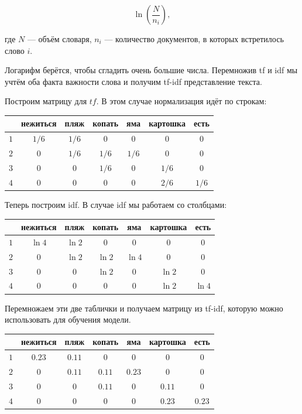 \documentclass[12pt, a4paper, oneside]{article}
\begin{document}
{\begin{enumerate}
\begin{itemize}
	\[ \ln \left( \frac{N}{n_i} \right), \]
	
	где $N$ --- объём словаря, $n_i$ --- количество документов, в которых встретилось слово $i$.
\end{itemize}

Логарифм берётся, чтобы сгладить очень большие числа. Перемножив tf и idf мы учтём оба факта важности слова и получим tf-idf представление текста. 

Построим матрицу для $tf$. В этом случае нормализация идёт по строкам:

\begin{center}
	\begin{tabular}{c|c|c|c|c|c|c}
		\hline
		&нежиться & пляж & копать & яма & картошка & есть \\
		\hline
		$1 $&  $1/6$ & $1/6$ & $0$ & $0 $& $0 $& $0$ \\
		$2$ & $0$ & $1/6$ & $1/6$ & $1/6$ & $0$ & $0$ \\
		$3$ & $0$ & $0$ & $1/6$ & $0$ & $1/6$ & $0$ \\
		$4$ &$ 0$ & $0$ &$ 0 $& $0$ & $2/6$ & $1/6$ \\
	\end{tabular}
\end{center}

Теперь построим idf. В случае idf мы работаем со столбцами: 

\begin{center}
	\begin{tabular}{c|c|c|c|c|c|c}
		\hline
		&нежиться & пляж & копать & яма & картошка & есть \\
		\hline
		$1 $&  $\ln 4$ & $\ln 2$ & $0$ & $0 $& $0 $& $0$ \\
		$2$ & $0$ & $\ln 2$ & $\ln 2$ & $\ln 4$ & $0$ & $0$ \\
		$3$ & $0$ & $0$ & $\ln 2$ & $0$ & $\ln 2$ & $0$ \\
		$4$ &$ 0$ & $0$ &$ 0 $& $0$ & $\ln 2$ & $\ln 4$ \\
	\end{tabular}
\end{center}

Перемножаем эти две таблички и получаем матрицу из tf-idf, которую можно использовать для обучения модели. 

\begin{center}
	\begin{tabular}{c|c|c|c|c|c|c}
		\hline
		&нежиться & пляж & копать & яма & картошка & есть \\
		\hline
		$1 $&  $0.23$ & $0.11$ & $0$ & $0 $& $0 $& $0$ \\
		$2$ & $0$ & $0.11$ & $0.11$ & $0.23$ & $0$ & $0$ \\
		$3$ & $0$ & $0$ & $0.11$ & $0$ & $0.11$ & $0$ \\
		$4$ &$ 0$ & $0$ &$ 0 $& $0$ & $0.23$ & $0.23$ \\
	\end{tabular}
\end{center}


\end{enumerate}}
\end{document}
